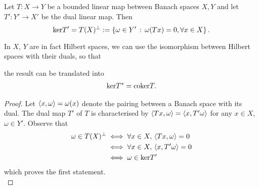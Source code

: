 \documentclass[12pt]{article}
\begin{document}
\begin{flemma} \label{lemma: kernel cokernel isomorphism} 
    Let $T: X \to Y$ be a bounded linear map between Banach spaces $X, Y$ and let $T' : Y' \to X'$ be the dual linear map. Then $$\ker T' = T(X)^\perp := \set{\omega \in Y' \wh \omega(Tx) = 0, \forall x \in X}.$$ 
\end{flemma}
\begin{rem}
    In $X$, $Y$ are in fact Hilbert spaces, we can use the isomorphism between Hilbert spaces with their duals, so that 
    \begin{center}
    \end{center}
     the result can be translated into  
    \begin{align*}
    \ker T^* = \coker T. 
    \end{align*}
\end{rem}
\begin{proof}
    Let $\inprod[x, \omega] = \omega(x)$ denote the pairing between a Banach space with its dual. The dual map $T'$ of $T$ is characterised by $\inprod[Tx, \omega] = \inprod[x, T'\omega]$ for any $x \in X$, $\omega \in Y'$. Observe that 
    \begin{align*}
    \omega \in T(X)^\perp 
    & \iff \forall x \in X, \, \inprod[Tx, \omega] = 0 \\
    & \iff \forall x \in X, \, \inprod[x, T' \omega] = 0 \\
    & \iff \omega \in \ker T'
    \end{align*}
    which proves the first statement. \\
    
%    
\end{proof}
\end{document}

